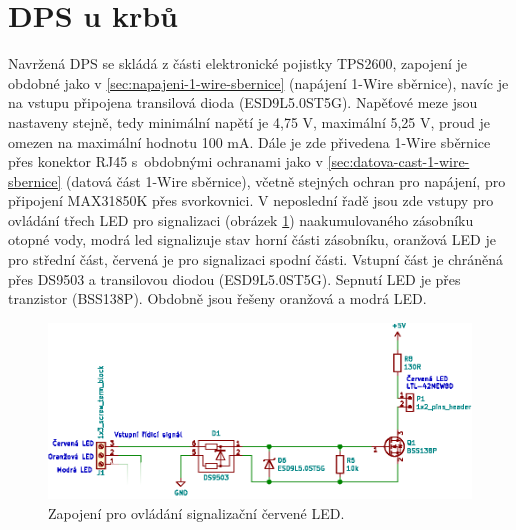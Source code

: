 \section{DPS u krbů}
Navržená DPS se skládá z části elektronické pojistky TPS2600, zapojení je obdobné jako v \ref{sec:napajeni-1-wire-sbernice} (napájení 1-Wire sběrnice), navíc je na vstupu připojena transilová dioda (ESD9L5.0ST5G). Napěťové meze jsou nastaveny stejně, tedy minimální napětí je 4,75 V, maximální 5,25 V, proud je omezen na maximální hodnotu 100 mA. Dále je zde přivedena 1-Wire sběrnice přes konektor RJ45 s~obdobnými ochranami jako v \ref{sec:datova-cast-1-wire-sbernice} (datová část 1-Wire sběrnice), včetně stejných ochran pro napájení, pro připojení MAX31850K přes svorkovnici. V neposlední řadě jsou zde vstupy pro ovládání třech LED pro signalizaci (obrázek \ref{fig:led-indikace}) naakumulovaného zásobníku otopné vody, modrá led signalizuje stav horní části zásobníku, oranžová LED je pro střední část, červená je pro signalizaci spodní části. Vstupní část je chráněná přes DS9503 a transilovou diodou (ESD9L5.0ST5G). Sepnutí LED je přes tranzistor (BSS138P). Obdobně jsou řešeny oranžová a modrá LED.

\begin{figure}[H]
    \centering
    \includegraphics[width=\textwidth]{images/svg/kicad/led-indikace.eps}
    \caption{Zapojení pro ovládání signalizační červené LED.}
    \label{fig:led-indikace}
\end{figure}

